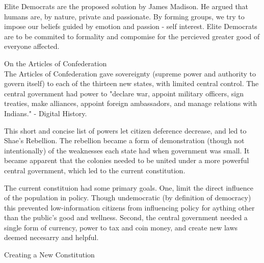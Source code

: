 \documentclass{article}
\begin{document}
Elite Democrats are the proposed solution by James Madison. He argued that humans are, by nature, private and passionate. By forming groups, we try to impose our beliefs guided by emotion and passion - self interest. Elite Democrats are to be commited to formality and compomise for the percieved greater good of everyone affected.

\noindent
\Large
On the Articles of Confederation\\
\normalsize
\indent
The Articles of Confederation gave sovereignty (supreme power and authority to govern itself) to each of the thirteen new states, with limited central control. The central government had power to "declare war, appoint military officers, sign treaties, make alliances, appoint foreign ambassadors, and manage relations with Indians." - Digital History.

This short and concise list of powers let citizen deference decrease, and led to Shae's Rebellion. The rebellion became a form of demonstration (though not intentionally) of the weaknesses each state had when government was small. It became apparent that the colonies needed to be united under a more powerful central government, which led to the current constitution.

The current constituion had some primary goals. One, limit the direct influence of the population in policy. Though undemocratic (by definition of democracy) this prevented low-information citizens from influencing policy for aything other than the public's good and wellness. Second, the central government needed a single form of currency, power to tax and coin money, and create new laws deemed necesarry and helpful.

\noindent
\Large
Creating a New Constitution\\
\normalsize
\indent
\end{document}
